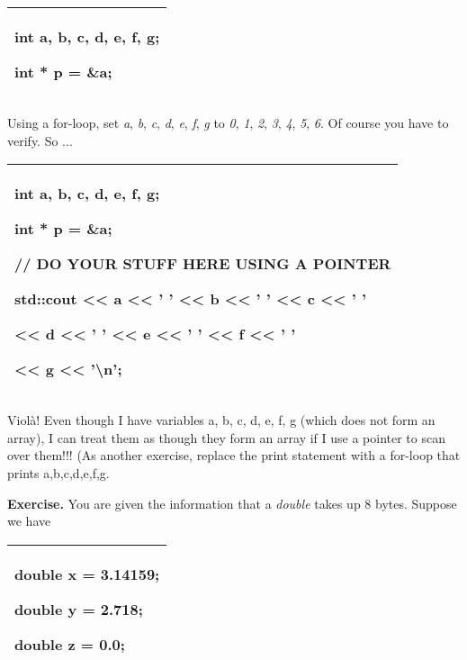 \documentclass[
]{article}
\begin{document}
\begin{longtable}[]{@{}l@{}}
\toprule
\endhead
\begin{minipage}[t]{0.97\columnwidth}\raggedright
int a, b, c, d, e, f, g;

int * p = \&a;\strut
\end{minipage}\tabularnewline
\bottomrule
\end{longtable}

Using a for-loop, set \emph{a}, \emph{b}, \emph{c}, \emph{d}, \emph{e},
\emph{f}, \emph{g} to \emph{0}, \emph{1}, \emph{2}, \emph{3}, \emph{4},
\emph{5}, \emph{6}. Of course you have to verify. So ...

\begin{longtable}[]{@{}l@{}}
\toprule
\endhead
\begin{minipage}[t]{0.97\columnwidth}\raggedright
int a, b, c, d, e, f, g;

int * p = \&a;

// DO YOUR STUFF HERE USING A POINTER

std::cout \textless\textless{} a \textless\textless{} ' '
\textless\textless{} b \textless\textless{} ' ' \textless\textless{} c
\textless\textless{} ' '

\textless\textless{} d \textless\textless{} ' ' \textless\textless{} e
\textless\textless{} ' ' \textless\textless{} f \textless\textless{} ' '

\textless\textless{} g \textless\textless{} '\textbackslash n';\strut
\end{minipage}\tabularnewline
\bottomrule
\end{longtable}

Violà! Even though I have variables a, b, c, d, e, f, g (which does not
form an array), I can treat them as though they form an array if I use a
pointer to scan over them!!! (As another exercise, replace the print
statement with a for-loop that prints a,b,c,d,e,f,g.

\textbf{Exercise.} You are given the information that a \emph{double}
takes up 8 bytes. Suppose we have

\begin{longtable}[]{@{}l@{}}
\toprule
\endhead
\begin{minipage}[t]{0.97\columnwidth}\raggedright
double x = 3.14159;

double y = 2.718;

double z = 0.0;\strut
\end{minipage}\tabularnewline
\bottomrule
\end{longtable}
\end{document}
